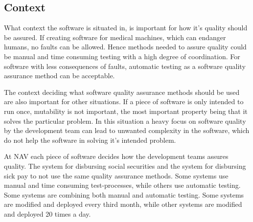 

\subsection{Context}
What context the software is situated in, is important for how it's quality should be assured. If creating software for medical machines, which can endanger humans, no faults can be allowed. Hence methods needed to assure quality could be manual and time consuming testing with a high degree of coordination. For software with less consequences of faults, automatic testing as a software quality assurance method can be acceptable.

The context deciding what software quality assurance methods should be used are also important for other situations. If a piece of software is only intended to run once, mutability is not important, the most important property being that it solves the particular problem. In this situation a heavy focus on software quality by the development team can lead to unwanted complexity in the software, which do not help the software in solving it's intended problem.

At NAV each piece of software decides how the development teams assures quality. The system for disbursing social securities and the system for disbursing sick pay to not use the same quality assurance methods. Some systems use manual and time consuming test-processes, while others use automatic testing. Some systems are combining both manual and automatic testing. Some systems are modified and deployed every third month, while other systems are modified and deployed 20 times a day.


